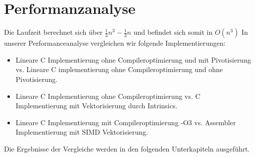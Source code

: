 \documentclass[course=erap]{aspdoc}
\begin{document}

\section{Performanzanalyse}
\label{Performanzanalyse}
Die Laufzeit berechnet sich über  $ \frac{1}{3}n^3 -\frac{1}{3} n $ und befindet sich somit in $O(n^3)$ \cite{LULaufzeit}
In unserer Performanceanalyse vergleichen wir folgende Implementierungen:\\
\begin{itemize}
\item Lineare C Implementierung ohne Compileroptimierung und mit Pivotisierung vs. Lineare C implementierung ohne Compileroptimierung und ohne Pivotisierung. 
\item Lineare C Implementierung ohne Compileroptimierung vs. C Implementierung mit Vektorisierung durch Intrinsics. 
\item Lineare C Implementierung mit Compileroptimierung -O3 vs. Assembler Implementierung mit SIMD Vektorisierung.
\end{itemize}
Die Ergebnisse der Vergleiche werden in den folgenden Unterkapiteln ausgeführt. \\
\end{document}
